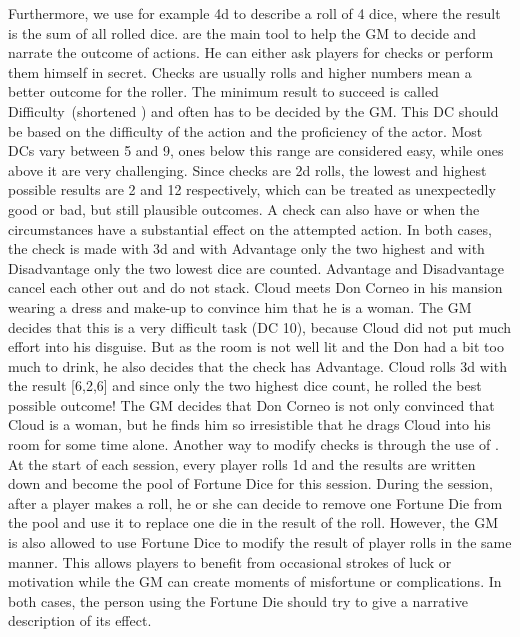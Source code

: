 Furthermore, we use for example 4d to describe a roll of 4 dice, where the result is the sum of all rolled dice.
 are the main tool to help the GM to decide and narrate the outcome of actions.
He can either ask players for checks or perform them himself in secret.
Checks are usually  rolls and higher numbers mean a better outcome for the roller. 
The minimum result to succeed is called Difficulty~(shortened ) and often has to be decided by the GM.
This DC should be based on the difficulty of the action and the proficiency of the actor.
Most DCs vary between 5 and 9, ones below this range are considered easy, while ones above it are very challenging.
%
\ofpar
%
Since checks are 2d rolls, the lowest and highest possible results are 2 and 12 respectively, which can be treated as unexpectedly good or bad, but still plausible outcomes.
A check can also have  or  when the circumstances have a substantial effect on the attempted action. 
In both cases, the check is made with 3d and with Advantage only the two highest and with Disadvantage only the two lowest dice are counted. 
Advantage and Disadvantage cancel each other out and do not stack.
%
\clearpage
%
{
	Cloud meets Don Corneo in his mansion wearing a dress and make-up to convince him that he is a woman.
	The GM decides that this is a very difficult task (DC 10), because Cloud did not put much effort into his disguise. 
	But as the room is not well lit and the Don had a bit too much to drink, he also decides that the check has Advantage. 
	Cloud rolls 3d with the result [6,2,6] and since only the two highest dice count, he rolled the best possible outcome! 
	The GM decides that Don Corneo is not only convinced that Cloud is a woman, but he finds him so irresistible that he drags Cloud into his room for some time alone.
}
%
\ofpar
%
Another way to modify checks is through the use of .
At the start of each session, every player rolls 1d and the results are written down and become the pool of Fortune Dice for this session.
During the session, after a player makes a roll, he or she can decide to remove one Fortune Die from the pool and use it to replace one die in the result of the roll.
However, the GM is also allowed to use Fortune Dice to modify the result of player rolls in the same manner.
This allows players to benefit from occasional strokes of luck or motivation while the GM can create moments of misfortune or complications.
In both cases, the person using the Fortune Die should try to give a narrative description of its effect.
